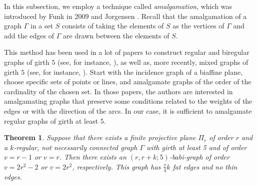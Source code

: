 \documentclass[a4paper,11pt]{article}
\newtheorem{theorem}{Theorem}[section]
\begin{document}
In this subsection, we employ a technique called \emph{amalgamation}, which was introduced by Funk in 2009  \cite{F2009} and Jorgensen \cite{jorg}. Recall that the amalgamation of a graph $\Gamma $ in a set $S$ consists of taking the elements of $S$ as the vertices of $\Gamma $ and add the edges of 
$\Gamma $ are drawn between the elements of $S$.


This method has been used in a lot of papers to construct regular and biregular graphs of girth $5$ (see, for instance, \cite{AABL11, AABB17, ABBM19, AB21}), as well as, more recently, mixed graphs of girth $5$ (see, for instance, \cite{ACG22, AM26, JJKP25}). 
Start with the incidence graph of a biaffine plane, choose specific sets of points or lines, and amalgamate graphs of the order of the cardinality of the chosen set.  In those papers, the authors are interested in amalgamating graphs that preserve some conditions related to the weights of the edges or with the direction of the arcs. In our case, it is sufficient to amalgamate regular graphs of girth at least $5$.


\begin{theorem}
Suppose that there exists a finite projective plane $\Pi _r$ of order $r$ and a $k$-regular, not necessarily connected graph $\Gamma $ with girth at least 5 and of order $v=r-1$ or $v=r$. Then there exists an 
$(r,r+k;5)$-babi-graph of order $v=2r^2-2$ or $v=2r^2$, respectively. This graph has $\frac{v}{4}k$ fat edges and no thin edges.  
\end{theorem}
\end{document}

